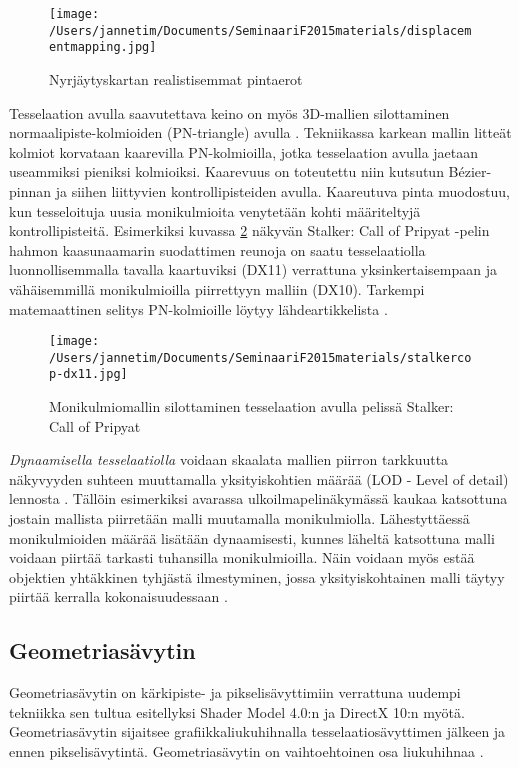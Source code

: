 \documentclass[finnish]{tktltiki2}
\theoremstyle{definition}
\theoremstyle{remark}
\begin{document}
\begin{figure}[t]
\texttt{[image: /Users/jannetim/Documents/SeminaariF2015materials/displacementmapping.jpg]}
\caption{Nyrjäytyskartan realistisemmat pintaerot}
\label{displacement}
\end{figure}

Tesselaation avulla saavutettava keino on myös 3D-mallien silottaminen normaalipiste-kolmioiden (PN-triangle) avulla \cite{Vla01}. Tekniikassa karkean mallin litteät kolmiot korvataan kaarevilla PN-kolmioilla, jotka tesselaation avulla jaetaan useammiksi pieniksi kolmioiksi. Kaarevuus on toteutettu niin kutsutun Bézier-pinnan ja siihen liittyvien kontrollipisteiden avulla. Kaareutuva pinta muodostuu, kun tesseloituja uusia monikulmioita venytetään kohti määriteltyjä kontrollipisteitä. Esimerkiksi kuvassa \ref{SCoP} näkyvän Stalker: Call of Pripyat -pelin hahmon kaasunaamarin suodattimen reunoja on saatu tesselaatiolla luonnollisemmalla tavalla kaartuviksi (DX11) verrattuna yksinkertaisempaan ja vähäisemmillä monikulmioilla piirrettyyn malliin (DX10). Tarkempi matemaattinen selitys PN-kolmioille löytyy lähdeartikkelista \cite{Vla01}.

\begin{figure}[!hbpt]
\texttt{[image: /Users/jannetim/Documents/SeminaariF2015materials/stalkercop-dx11.jpg]}
\caption{Monikulmiomallin silottaminen tesselaation avulla pelissä Stalker: Call of Pripyat}
\label{SCoP}
\end{figure}

\emph{Dynaamisella tesselaatiolla} voidaan skaalata mallien piirron tarkkuutta näkyvyyden suhteen muuttamalla yksityiskohtien määrää (LOD - Level of detail) lennosta \cite[s. 448]{Gre14}. Tällöin esimerkiksi avarassa ulkoilmapelinäkymässä kaukaa katsottuna jostain mallista piirretään malli muutamalla monikulmiolla. Lähestyttäessä monikulmioiden määrää lisätään dynaamisesti, kunnes läheltä katsottuna malli voidaan piirtää tarkasti tuhansilla monikulmioilla. Näin voidaan myös estää objektien yhtäkkinen tyhjästä ilmestyminen, jossa yksityiskohtainen malli täytyy piirtää kerralla kokonaisuudessaan \cite{Nvi10}.

\subsection{Geometriasävytin}

Geometriasävytin on kärkipiste- ja pikselisävyttimiin verrattuna uudempi tekniikka sen tultua esitellyksi Shader Model 4.0:n ja DirectX 10:n myötä. Geometriasävytin sijaitsee grafiikkaliukuhihnalla tesselaatiosävyttimen jälkeen ja ennen pikselisävytintä. Geometriasävytin on vaihtoehtoinen osa liukuhihnaa \cite{Mic11}.
\end{document}

